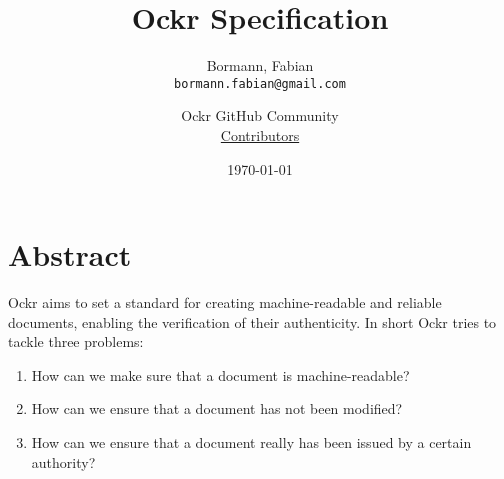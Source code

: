 \documentclass{article}
\title{Ockr Specification}
\author{
  Bormann, Fabian\\
  \texttt{bormann.fabian@gmail.com}
  \and
  Ockr GitHub Community\\
  \href{https://github.com/ockr-io/ockr-specification/graphs/contributors}{Contributors}
}
\date{\today}
\begin{document}
\maketitle

\section{Abstract}

Ockr aims to set a standard for creating machine-readable and reliable documents, 
enabling the verification of their authenticity. In short Ockr tries to tackle 
three problems:

\begin{enumerate}
    \item How can we make sure that a document is machine-readable?
    \item How can we ensure that a document has not been modified?
    \item How can we ensure that a document really has been issued by a certain authority?
\end{enumerate}





\end{document}
